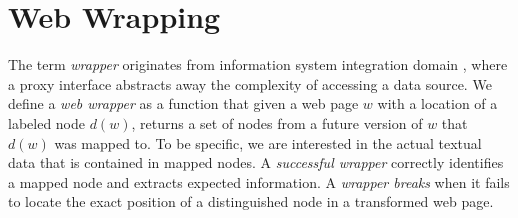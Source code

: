 \section{Web Wrapping}

The term \emph{wrapper} originates from information system integration domain \cite{Chang:2006:SWI:1159162.1159300}, where a proxy interface abstracts away the complexity of accessing a data source. We define a \emph{web wrapper} as a function that given a web page $w$ with a location of a labeled node $d(w)$, returns a set of nodes from a future version of $w$ that $d(w)$ was mapped to. To be specific, we are interested in the actual textual data that is contained in mapped nodes. A \emph{successful wrapper} correctly identifies a mapped node and extracts expected information. A \emph{wrapper breaks} when it fails to locate the exact position of a distinguished node in a transformed web page.


